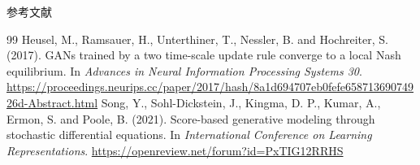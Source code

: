 \documentclass[11pt]{beamer}
\theoremstyle{plain}
\theoremstyle{definition}
\begin{document}
\begin{frame}[allowframebreaks]{参考文献}
\begin{thebibliography}{99}
    Heusel, M., Ramsauer, H., Unterthiner, T., Nessler, B. and Hochreiter, S. (2017).
    GANs trained by a two time-scale update rule converge to a local Nash equilibrium.
    In \textit{Advances in Neural Information Processing Systems 30}.
    \url{https://proceedings.neurips.cc/paper/2017/hash/8a1d694707eb0fefe65871369074926d-Abstract.html}
    Song, Y., Sohl-Dickstein, J., Kingma, D. P., Kumar, A.,
    Ermon, S. and Poole, B. (2021).
    Score-based generative modeling through stochastic differential equations.
    In \textit{International Conference on Learning Representations}.
    \url{https://openreview.net/forum?id=PxTIG12RRHS}


    \end{thebibliography}
    \end{frame}
  
\end{document}
